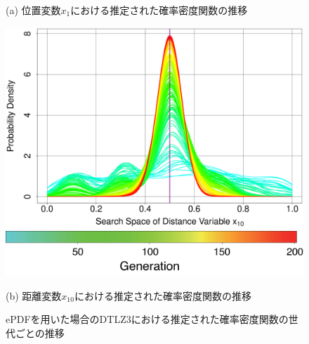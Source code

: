 \documentclass[../main/main]{subfiles}
\begin{document}
\begin{figure}[!h]
\begin{minipage}{0.61\hsize}
\begin{minipage}{0.49\hsize}
\begin{center}
{\footnotesize (a) 位置変数$x_1$における推定された確率密度関数の推移}
\end{center}
\end{minipage}
\begin{minipage}{0.49\hsize}
\includegraphics[width=1\linewidth]{../figures/DTLZ3_var10_pdf_trend.eps}\\
\centering
\hspace{0.2in} \includegraphics[width=0.8\linewidth]{../figures/color_bar.eps}
\begin{center}
{\footnotesize (b) 距離変数$x_{10}$における推定された確率密度関数の推移}
\end{center}
\end{minipage}
\caption{ePDFを用いた場合のDTLZ3における推定された確率密度関数の世代ごとの推移}
\label{pdf_trans}
\end{minipage}
\label{fig:nondom_sol}
\end{figure}

\clearpage
\end{document}
